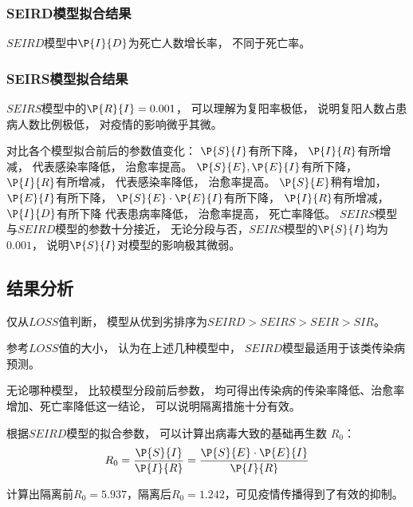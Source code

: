 \subsubsection{SEIRD模型拟合结果}
\par $SEIRD$模型中$\P{I}{D}$为死亡人数增长率，
不同于死亡率。
\subsubsection{SEIRS模型拟合结果}
\par $SEIRS$模型中的$\P{R}{I}=0.001$，
可以理解为复阳率极低，
说明复阳人数占患病人数比例极低，
对疫情的影响微乎其微。
\par 对比各个模型拟合前后的参数值变化：
$\P{S}{I}$有所下降，
$\P{I}{R}$有所增减，
代表感染率降低，
治愈率提高。
$\P{S}{E},\P{E}{I}$有所下降，
$\P{I}{R}$有所增减，
代表感染率降低，
治愈率提高。
$\P{S}{E}$稍有增加，
$\P{E}{I}$有所下降，
$\P{S}{E}\cdot \P{E}{I}$有所下降，
$\P{I}{R}$有所增减，
$\P{I}{D}$有所下降
代表患病率降低，
治愈率提高，
死亡率降低。
$SEIRS$模型与$SEIRD$模型的参数十分接近，
无论分段与否，$SEIRS$模型的$\P{S}{I}$均为$0.001$，
说明$\P{S}{I}$对模型的影响极其微弱。
\subsection{结果分析}
\par 仅从$LOSS$值判断，
模型从优到劣排序为$SEIRD>SEIRS>SEIR>SIR$。
\par 参考$LOSS$值的大小，
认为在上述几种模型中，
$SEIRD$模型最适用于该类传染病预测。
\par 无论哪种模型，
比较模型分段前后参数，
均可得出传染病的传染率降低、治愈率增加、死亡率降低这一结论，
可以说明隔离措施十分有效。
\par 根据$SEIRD$模型的拟合参数，
可以计算出病毒大致的基础再生数
$R_0$\cite{应用SEIR模型预测2009年甲型H1N1流感流行趋势,王宝童2013流感传播数学模型的基本再生数}：
\begin{equation}
    R_0 = \frac{\P{S}{I}}{\P{I}{R}}
    = \frac{\P{S}{E}\cdot \P{E}{I}}{\P{I}{R}}
\end{equation}
\par 计算出隔离前$R_0=5.937$，隔离后$R_0=1.242$，可见疫情传播得到了有效的抑制。